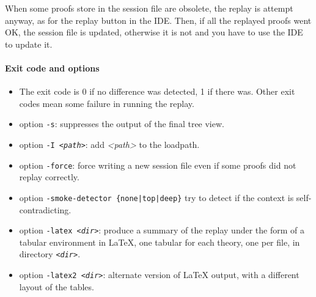 When some proofs store in the session file are obsolete, the replay is
attempt anyway, as for the replay button in the IDE. Then, if all the
replayed proofs went OK, the session file is updated, otherwise it is
not and you have to use the IDE to update it.

\paragraph{Exit code and options}

\begin{itemize}
\item The exit code is 0 if no difference was detected, 1 if there
  was. Other exit codes mean some failure in running the replay.
\item option \texttt{-s}: suppresses the output of the final tree view.
\item option \texttt{-I \textsl{<path>}}: add \textsl{<path>} to the loadpath.
\item option \texttt{-force}: force writing a new session file even if
  some proofs did not replay correctly.
\item option \texttt{-smoke-detector \{none|top|deep\}} try to detect
  if the context is self-contradicting.
\item option \texttt{-latex \textsl{<dir>}}: produce a summary of
  the replay under the form of a tabular environment in LaTeX, one
  tabular for each theory, one per file, in directory \texttt{\textsl{<dir>}}.
\item option \texttt{-latex2 \textsl{<dir>}}: alternate version of
  LaTeX output, with a different layout of the tables.
\end{itemize}

